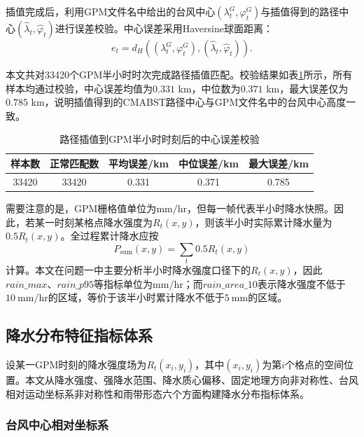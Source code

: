 \documentclass[UTF8,a4paper,zihao=5]{ctexart}
\numberwithin{equation}{section}
\numberwithin{figure}{section}
\numberwithin{table}{section}
\begin{document}
插值完成后，利用GPM文件名中给出的台风中心$(\lambda_t^G,\varphi_t^G)$与插值得到的路径中心$(\hat{\lambda}_t,\hat{\varphi}_t)$进行误差校验。中心误差采用Haversine球面距离：
\begin{equation}
    e_t=d_H\left((\lambda_t^G,\varphi_t^G),(\hat{\lambda}_t,\hat{\varphi}_t)\right).
\end{equation}

本文共对33420个GPM半小时时次完成路径插值匹配。校验结果如表\ref{tab:interp_quality_problem1}所示，所有样本均通过校验，中心误差均值为$0.331$ km，中位数为$0.371$ km，最大误差仅为$0.785$ km，说明插值得到的CMABST路径中心与GPM文件名中的台风中心高度一致。

\begin{table}[htbp]
    \centering
    \caption{路径插值到GPM半小时时刻后的中心误差校验}
    \label{tab:interp_quality_problem1}
    \begin{tabular}{ccccc}
        \hline
        样本数 & 正常匹配数 & 平均误差/km & 中位误差/km & 最大误差/km \\
        \hline
        33420 & 33420 & 0.331 & 0.371 & 0.785 \\
        \hline
    \end{tabular}
\end{table}

需要注意的是，GPM栅格值单位为$\mathrm{mm/hr}$，但每一帧代表半小时降水快照。因此，若某一时刻某格点降水强度为$R_t(x,y)$，则该半小时实际累计降水量为$0.5R_t(x,y)$。全过程累计降水应按
\begin{equation}
    P_{\mathrm{sum}}(x,y)=\sum_t 0.5R_t(x,y)
\end{equation}
计算。本文在问题一中主要分析半小时降水强度口径下的$R_t(x,y)$，因此$rain\_max$、$rain\_p95$等指标单位为$\mathrm{mm/hr}$；而$rain\_area\_10$表示降水强度不低于$10\ \mathrm{mm/hr}$的区域，等价于该半小时累计降水不低于$5\ \mathrm{mm}$的区域。

\subsection{降水分布特征指标体系}

设某一GPM时刻的降水强度场为$R_t(x_i,y_i)$，其中$(x_i,y_i)$为第$i$个格点的空间位置。本文从降水强度、强降水范围、降水质心偏移、固定地理方向非对称性、台风相对运动坐标系非对称性和雨带形态六个方面构建降水分布指标体系。

\subsubsection{台风中心相对坐标系}
\end{document}
